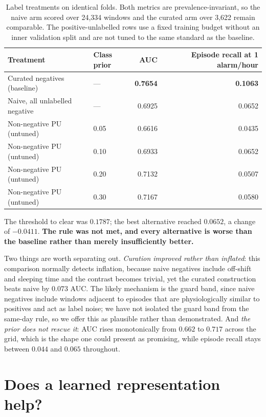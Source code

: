 \begin{table}[t]
\caption{Label treatments on identical folds. Both metrics are
prevalence-invariant, so the naive arm scored over 24{,}334 windows and the
curated arm over 3{,}622 remain comparable. The positive-unlabelled rows use a
fixed training budget without an inner validation split and are not tuned to
the same standard as the baseline.}
\label{tab:pu}
\centering
\begin{tabular}{llrr}
\toprule
Treatment & Class prior & AUC & Episode recall at 1 alarm/hour \\
\midrule
Curated negatives (baseline) & --- & \textbf{0.7654} & \textbf{0.1063} \\
Naive, all unlabelled negative & --- & 0.6925 & 0.0652 \\
Non-negative PU (untuned) & 0.05 & 0.6616 & 0.0435 \\
Non-negative PU (untuned) & 0.10 & 0.6933 & 0.0652 \\
Non-negative PU (untuned) & 0.20 & 0.7132 & 0.0507 \\
Non-negative PU (untuned) & 0.30 & 0.7167 & 0.0580 \\
\bottomrule
\end{tabular}
\end{table}

The threshold to clear was $0.1787$; the best alternative reached $0.0652$, a
change of $-0.0411$. \textbf{The rule was not met, and every alternative is
worse than the baseline rather than merely insufficiently better.}

Two things are worth separating out. \emph{Curation improved rather than
inflated}: this comparison normally detects inflation, because naive negatives
include off-shift and sleeping time and the contrast becomes trivial, yet the
curated construction beats naive by $0.073$ AUC. The likely mechanism is the
guard band, since naive negatives include windows adjacent to episodes that are
physiologically similar to positives and act as label noise; we have not
isolated the guard band from the same-day rule, so we offer this as plausible
rather than demonstrated. And \emph{the prior does not rescue it}: AUC rises
monotonically from $0.662$ to $0.717$ across the grid, which is the shape one
could present as promising, while episode recall stays between $0.044$ and
$0.065$ throughout.

\section{Does a learned representation help?}
\label{sec:ssl}

